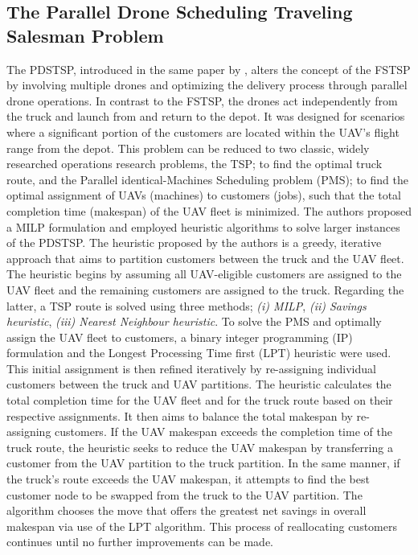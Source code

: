 \documentclass{article}
\begin{document}
	\subsection{The Parallel Drone Scheduling Traveling Salesman Problem}
	The PDSTSP, introduced in the same paper \cite{Murray2015} by \citeauthor{Murray2015}, alters the concept of the FSTSP by involving multiple drones and optimizing the delivery process through parallel drone operations. In contrast to the FSTSP, the drones act independently from the truck and launch from and return to the depot. It was designed for scenarios where a significant portion of the customers are located within the UAV's flight range from the depot. This problem can be reduced to two classic, widely researched operations research problems, the TSP; to find the optimal truck route, and the Parallel identical-Machines Scheduling problem (PMS); to find the optimal assignment of UAVs (machines) to customers (jobs), such that the total completion time (makespan) of the UAV fleet is minimized. The authors proposed a MILP formulation and employed heuristic algorithms to solve larger instances of the PDSTSP.
	The heuristic proposed by the authors is a greedy, iterative approach that aims to partition customers between the truck and the UAV fleet. The heuristic begins by assuming all UAV-eligible customers are assigned to the UAV fleet and the remaining customers are assigned to the truck. Regarding the latter, a TSP route is solved using three methods; \textit{(i) MILP}, \textit{(ii) Savings heuristic}, \textit{(iii) Nearest Neighbour heuristic}. To solve the PMS and optimally assign the UAV fleet to customers, a binary integer programming (IP) formulation and the Longest Processing Time first (LPT) heuristic were used. This initial assignment is then refined iteratively by re-assigning individual customers between the truck and UAV partitions. The heuristic calculates the total completion time for the UAV fleet and for the truck route based on their respective assignments. It then aims to balance the total makespan by re-assigning customers. If the UAV makespan exceeds the completion time of the truck route, the heuristic seeks to reduce the UAV makespan by transferring a customer from the UAV partition to the truck partition. In the same manner, if the truck's route exceeds the UAV makespan, it attempts to find the best customer node to be swapped from the truck to the UAV partition. The algorithm chooses the move that offers the greatest net savings in overall makespan via use of the LPT algorithm. This process of reallocating customers continues until no further improvements can be made.
\end{document}
